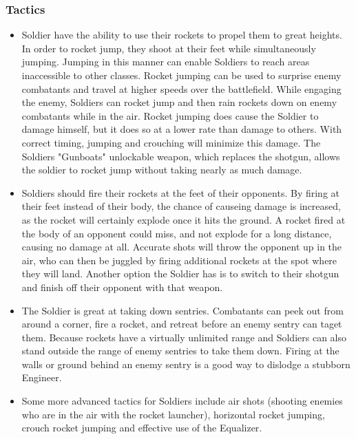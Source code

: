 \subsubsection {Tactics}
\begin {itemize} 

\item Soldier have the ability to use their rockets to propel them to great heights.  In order to rocket jump, they shoot at their feet while simultaneously jumping. Jumping in this manner can enable Soldiers to reach areas inaccessible to other classes. Rocket jumping can be used to surprise enemy combatants and travel at higher speeds over the battlefield. While engaging the enemy, Soldiers can rocket jump and then rain rockets down on enemy combatants while in the air. Rocket jumping does cause the Soldier to damage himself, but it does so at a lower rate than damage to others. With correct timing, jumping and crouching will minimize this damage. The Soldiers "Gunboats" unlockable weapon, which replaces the shotgun, allows the soldier to rocket jump without taking nearly as much damage.

\item Soldiers should fire their rockets at the feet of their opponents.  By firing at their feet instead of their body, the chance of causeing damage is increased, as the rocket will certainly explode once it hits the ground.  A rocket fired at the body of an opponent could miss, and not explode for a long distance, causing no damage at all.  Accurate shots will throw the opponent up in the air, who can then be juggled by firing additional rockets at the spot where they will land.  Another option the Soldier has is to switch to their shotgun and finish off their opponent with that weapon.

\item The Soldier is great at taking down sentries. Combatants can peek out from around a corner, fire a rocket, and retreat before an enemy sentry can taget them. Because rockets have a virtually unlimited range and Soldiers can also stand outside the range of enemy sentries to take them down. Firing at the walls or ground behind an enemy sentry is a good way to dislodge a stubborn Engineer. 

\item Some more advanced tactics for Soldiers include air shots (shooting enemies who are in the air with the rocket launcher), horizontal rocket jumping, crouch rocket jumping and effective use of the Equalizer.

\end {itemize}